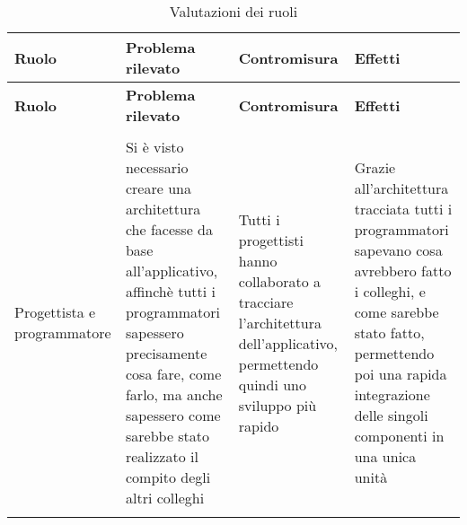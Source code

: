 \documentclass[../piano_di_qualifica.tex]{subfiles}
\begin{document}
\begin{center}
	\begin{longtable}{|p{2.5cm}|p{4.5cm}|p{4.5cm}|p{4.5cm}|}
		\hline
		\rowcolor{lightgray}
		{\textbf{Ruolo}} & {\textbf{Problema rilevato}} & {\textbf{Contromisura}} & {\textbf{Effetti}}  \\
		\hline
		\endfirsthead
		\hline
		\rowcolor{lightgray}
		{\textbf{Ruolo}} & {\textbf{Problema rilevato}} & {\textbf{Contromisura}} & {\textbf{Effetti}} \\
		\hline
		\endhead

		\hline
		\rowcolor{white}
		\multicolumn{3}{|c|}{\emph{Continua alla pagina successiva...}} \\
		\hline
		\endfoot
		\endlastfoot

		Progettista e programmatore & Si è visto necessario creare una architettura che facesse da base all’applicativo, affinchè tutti i programmatori sapessero precisamente cosa fare, come farlo, ma anche sapessero come sarebbe stato realizzato il compito degli altri colleghi & Tutti i progettisti hanno collaborato a tracciare l’architettura dell’applicativo, permettendo quindi uno sviluppo più rapido & Grazie all’architettura tracciata tutti i programmatori sapevano cosa avrebbero fatto i colleghi, e  come sarebbe stato fatto, permettendo poi una rapida integrazione delle singoli componenti in una unica unità  \\

		\hline
		\rowcolor{white}
		\caption{Valutazioni dei ruoli}
	\end{longtable}
\end{center}
\end{document}
